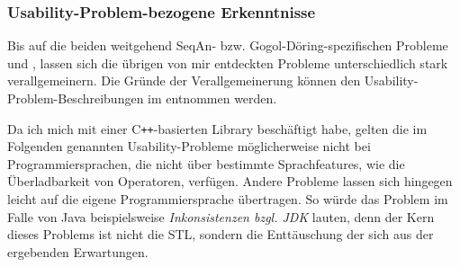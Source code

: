 \subsubsection{Usability-Problem-bezogene Erkenntnisse}

Bis auf die beiden weitgehend SeqAn- bzw. Gogol-Döring-spezifischen Probleme  und , lassen sich die übrigen von mir entdeckten Probleme unterschiedlich stark verallgemeinern. Die Gründe der Verallgemeinerung können den Usability-Problem-Beschreibungen im  entnommen werden.

Da ich mich mit einer C\texttt{++}-basierten Library beschäftigt habe, gelten die im Folgenden genannten Usability-Probleme möglicherweise nicht bei Programmiersprachen, die nicht über bestimmte Sprachfeatures, wie die Überladbarkeit von Operatoren, verfügen. Andere Probleme lassen sich hingegen leicht auf die eigene Programmiersprache übertragen. So würde das Problem  im Falle von Java beispielsweise \textit{Inkonsistenzen bzgl. JDK} lauten, denn der Kern dieses Problems ist nicht die STL, sondern die Enttäuschung der sich aus der  ergebenden Erwartungen.

